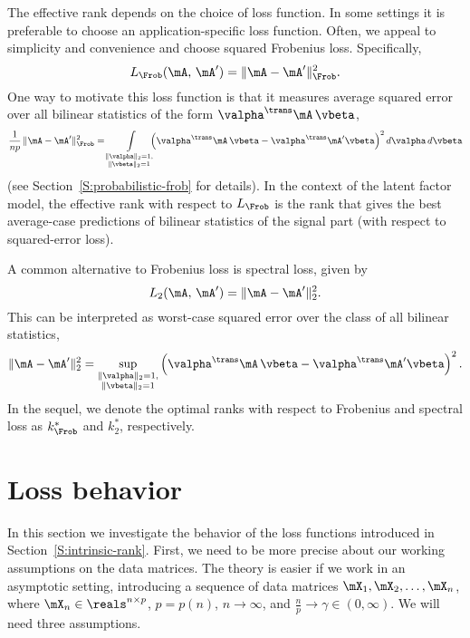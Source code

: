 The effective rank depends on the choice of loss function.  In some settings it is preferable to choose an application-specific loss function.  Often, we appeal to simplicity and convenience and choose squared Frobenius loss.  Specifically,
\begin{equation}
    L_\Frob ( \mA, \, \mA' )
        = \| \mA - \mA' \|_\Frob^2.
\end{equation}
One way to motivate this loss function is that it measures average squared error over all bilinear statistics of the form 
$\valpha^\trans \mA \, \vbeta$,
\[
    \frac{1}{np} \,
    \| \mA - \mA' \|_\Frob^2
    =
    \int\limits_{ \substack{ \| \valpha \|_2 = 1, \\
                             \| \vbeta \|_2  = 1 } }
        \!\!\!\!
        \left(
            \valpha^\trans \mA \, \vbeta
            -
            \valpha^\trans \mA' \vbeta
        \right)^2
        d\valpha \,
        d\vbeta
\]
(see Section~\ref{S:probabilistic-frob} for details).
In the context of the latent factor model, the effective rank with respect
to $L_\Frob$ is the rank that gives the best average-case predictions of 
bilinear statistics of the signal part (with respect to squared-error loss). 

A common alternative to Frobenius loss is spectral loss, given by
\begin{equation}
    L_2 ( \mA, \, \mA' )
        = \| \mA - \mA' \|_2^2.
\end{equation}
This can be interpreted as worst-case squared error over the class of all 
bilinear statistics,
\[
    \| \mA - \mA' \|_2^2
        =
            \sup_{ \substack{ \| \valpha \|_2 = 1, \\
                              \| \vbeta \|_2  = 1 } }
                \left(
                    \valpha^\trans \mA \, \vbeta
                    -
                    \valpha^\trans \mA' \vbeta
                \right)^2.
\]
In the sequel, we denote the optimal ranks with respect to Frobenius and
spectral loss as $k^\ast_\Frob$ and $k^\ast_2$, respectively.


\section{Loss behavior}\label{S:loss-behavior}

In this section we investigate the behavior of the loss functions introduced
in Section~\ref{S:intrinsic-rank}.  First, we need to be more precise about
our working assumptions on the data matrices.  The theory is easier if we
work in an asymptotic setting, introducing a sequence of data matrices
$\mX_1, \mX_2, \ldots, \mX_n$, where $\mX_n \in \reals^{n \times p}$, $p = p(n)$, $n \to \infty$, and $\frac{n}{p} \to \gamma \in (0,\infty)$.  We
will need three assumptions.

